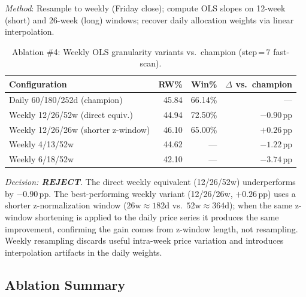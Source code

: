 \documentclass[11pt,letterpaper]{article}
\begin{document}
\textit{Method}: Resample to weekly (Friday close); compute OLS slopes on
12-week (short) and 26-week (long) windows; recover daily allocation weights via
linear interpolation.

\begin{table}[H]
  \centering
  \caption{Ablation \#4: Weekly OLS granularity variants vs.\ champion
           (step\,=\,7 fast-scan).}
  \label{tab:abl4}
  \begin{tabular}{lrrr}
    \toprule
    \textbf{Configuration} & \textbf{RW\%} & \textbf{Win\%}
    & \textbf{$\Delta$ vs.\ champion} \\
    \midrule
    Daily 60/180/252d (champion)      & 45.84 & 66.14\% & ---          \\
    Weekly 12/26/52w (direct equiv.)  & 44.94 & 72.50\% & $-0.90$\,pp  \\
    Weekly 12/26/26w (shorter z-window)& 46.10 & 65.00\% & $+0.26$\,pp \\
    Weekly 4/13/52w                   & 44.62 & ---     & $-1.22$\,pp  \\
    Weekly 6/18/52w                   & 42.10 & ---     & $-3.74$\,pp  \\
    \bottomrule
  \end{tabular}
\end{table}

\textit{Decision: \textbf{REJECT}.}  The direct weekly equivalent (12/26/52w)
underperforms by $-0.90$\,pp.  The best-performing weekly variant
(12/26/26w, $+0.26$\,pp) uses a shorter z-normalization window
($26\text{w}\approx 182\text{d}$ vs.\ $52\text{w}\approx 364\text{d}$); when the
same z-window shortening is applied to the daily price series it produces the
same improvement, confirming the gain comes from z-window length, not resampling.
Weekly resampling discards useful intra-week price variation and introduces
interpolation artifacts in the daily weights.

\subsection{Ablation Summary}
\end{document}
